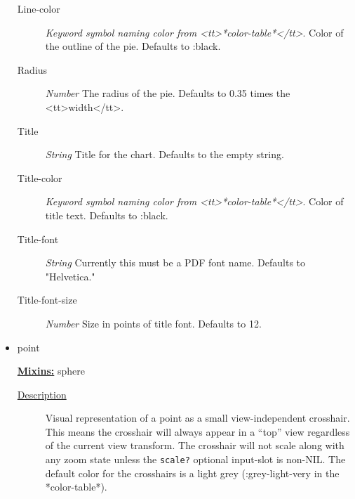 \documentclass [11pt]{book}
\begin{document}
\begin{itemize}
\begin{description}
\item [Line-color]
\emph{Keyword symbol naming color from <tt>*color-table*</tt>}.
Color of the outline of the pie. Defaults to :black.


\item [Radius]
\emph{Number} The radius of the pie. Defaults to 0.35 times the <tt>width</tt>.


\item [Title]
\emph{String} Title for the chart. Defaults to the empty string.


\item [Title-color]
\emph{Keyword symbol naming color from <tt>*color-table*</tt>}.
Color of title text. Defaults to :black.


\item [Title-font]
\emph{String} Currently this must be a PDF font name. Defaults to "Helvetica."


\item [Title-font-size]
\emph{Number} Size in points of title font. Defaults to 12.


\end{description}







\item {}point


\textbf{
\underline{Mixins:}} sphere





\begin{description}

\item [
\underline{Description}]


Visual representation of a point as a small view-independent crosshair. This means
the crosshair will always appear in a ``top'' view regardless of the current view transform. The crosshair will
not scale along with any zoom state unless the \texttt{scale?} optional input-slot is non-NIL. The default
color for the crosshairs is a light grey (:grey-light-very in the *color-table*).



\end{description}





\end{itemize}
\end{document}
